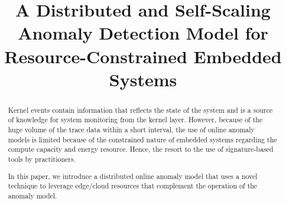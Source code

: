 \documentclass[conference]{IEEEtran}
\numberwithin{equation}{section}
\begin{document}
%
\title{A Distributed and Self-Scaling Anomaly Detection Model for 
Resource-Constrained Embedded Systems}



\author{
}


\maketitle

\begin{abstract}
Kernel events contain information that reflects the state of the system and is 
a source of knowledge for system monitoring from the kernel layer. However, 
because of the huge volume of the trace data within a short interval, the use 
of online anomaly models is limited because of the constrained nature of 
embedded systems regarding the compute capacity and energy resource. Hence, the 
resort to the use of signature-based tools by practitioners. \par
In this paper, we introduce a distributed online anomaly model that uses a 
novel technique to leverage edge/cloud resources that complement the operation 
of the anomaly model. 
\end{abstract}

\IEEEpeerreviewmaketitle



\end{document}
